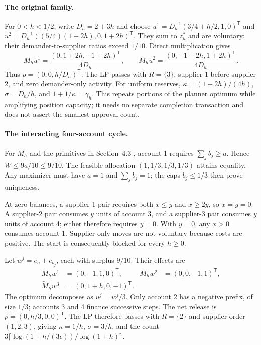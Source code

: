 \documentclass[ecta,draft,supplement]{econsocart}
\theoremstyle{definition}
\theoremstyle{definition}
\begin{document}
\begin{appendix}
\paragraph{The original family.}
For $0<h<1/2$, write $D_h=2+3h$ and choose
$u^1=D_h^{-1}(3/4+h/2,1,0)^{\mathsf T}$ and
$u^2=D_h^{-1}((5/4)(1+2h),0,1+2h)^{\mathsf T}$.
They sum to $z_h^*$ and are voluntary: their demander-to-supplier
ratios exceed $1/10$. Direct multiplication gives
\[
 M_hu^1=\frac{(0,1+2h,-1+2h)^{\mathsf T}}{4D_h},
 \qquad
 M_hu^2=\frac{(0,-1-2h,1+2h)^{\mathsf T}}{4D_h}.
\]
Thus $p=(0,0,h/D_h)^{\mathsf T}$. The LP passes with $R=\{3\}$,
supplier 1 before supplier 2, and zero demander-only activity.
For uniform reserves, $\kappa=(1-2h)/(4h)$,
$\sigma=D_h/h$, and $1+1/\kappa=\gamma_h$.
This repeats portions of the planner optimum while amplifying
position capacity; it needs no separate completion transaction
and does not assert the smallest approval count.

\paragraph{The interacting four-account cycle.}
For $\widetilde M_h$ and the primitives in
Section~4.3%
, account 1 requires
$\sum_jb_j\geq a$. Hence $W\leq9a/10\leq9/10$.
The feasible allocation $(1,1/3,1/3,1/3)$ attains equality.
Any maximizer must have $a=1$ and $\sum_jb_j=1$;
the caps $b_j\leq1/3$ then prove uniqueness.

At zero balances, a supplier-1 pair requires both $x\leq y$
and $x\geq2y$, so $x=y=0$. A supplier-2 pair consumes $y$
units of account 3, and a supplier-3 pair consumes $y$ units of
account 4; either therefore requires $y=0$. With $y=0$, any
$x>0$ consumes account 1. Supplier-only moves are not voluntary
because costs are positive. The start is consequently blocked
for every $h\geq0$.

Let $w^j=e_a+e_{b_j}$, each with surplus $9/10$. Their effects are
\[
 \begin{aligned}
 \widetilde M_hw^1&=(0,-1,1,0)^{\mathsf T},&
 \widetilde M_hw^2&=(0,0,-1,1)^{\mathsf T},\\
 \widetilde M_hw^3&=(0,1+h,0,-1)^{\mathsf T}.&&
 \end{aligned}
\]
The optimum decomposes as $u^j=w^j/3$. Only account 2 has a
negative prefix, of size $1/3$; accounts 3 and 4 finance successive
steps. The net release is $p=(0,h/3,0,0)^{\mathsf T}$.
The LP therefore passes with $R=\{2\}$ and supplier order
$(1,2,3)$, giving $\kappa=1/h$, $\sigma=3/h$, and the count
$3\lceil\log(1+h/(3\epsilon))/\log(1+h)\rceil$.


\end{appendix}
\end{document}
